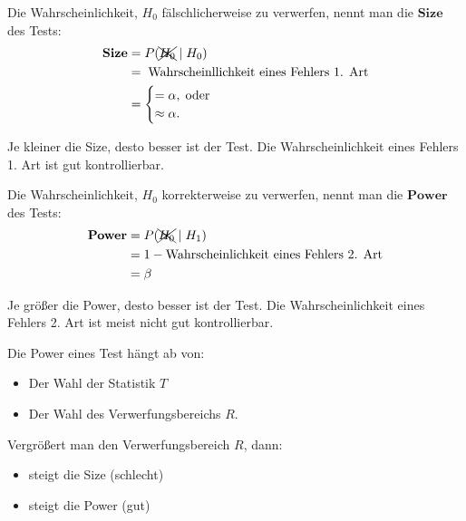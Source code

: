 \documentclass[10pt]{article}
\begin{document}
	\begin{Definition}
			Die Wahrscheinlichkeit, $H_0$ fälschlicherweise zu verwerfen, nennt man die $\textbf{Size}$ des Tests:
			\begin{equation*}
			\begin{split}
				\textbf{Size} &= P(\xcancel{H_0} \mid H_0)\\
				&= \; \text{Wahrscheinllichkeit eines Fehlers 1. Art}\\
				&= \begin{cases}
					= \alpha, \; \text{oder}\\
					\approx \alpha.
				\end{cases}
			\end{split}
		\end{equation*}
		
		Je kleiner die Size, desto besser ist der Test. Die Wahrscheinlichkeit eines Fehlers 1. Art ist gut kontrollierbar.
	\end{Definition}
	
	\begin{Definition}
		Die Wahrscheinlichkeit, $H_0$ korrekterweise zu verwerfen, nennt man die $\textbf{Power}$ des Tests:
		\begin{equation*}
			\begin{split}
				\textbf{Power} &= P(\xcancel{H_0} \mid H_1)\\
							&= 1 - \text{Wahrscheinlichkeit eines Fehlers 2. Art}\\
							&= \beta
			\end{split}
		\end{equation*}
		
		Je größer die Power, desto besser ist der Test. Die Wahrscheinlichkeit eines Fehlers 2. Art ist meist nicht gut kontrollierbar. 
		
		Die Power eines Test hängt ab von:
		\begin{itemize}
			\item Der Wahl der Statistik $T$
			\item Der Wahl des Verwerfungsbereichs $R$.
		\end{itemize}
	\end{Definition}

	\begin{Bemerkung}
		Vergrößert man den Verwerfungsbereich $R$, dann:
		\begin{itemize}
			\item steigt die Size (schlecht)
			\item steigt die Power (gut)
		\end{itemize}
	\end{Bemerkung}
	
\end{document}
